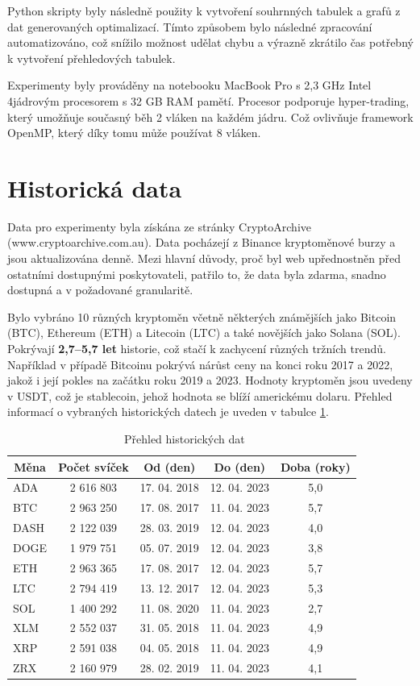 Python skripty byly následně použity k vytvoření souhrnných tabulek a grafů z dat generovaných optimalizací.
Tímto způsobem bylo následné zpracování automatizováno, což snížilo možnost udělat chybu a výrazně zkrátilo čas potřebný k vytvoření přehledových tabulek.

Experimenty byly prováděny na notebooku MacBook Pro s 2,3 GHz Intel 4jádrovým procesorem s 32 GB RAM pamětí.
Procesor podporuje hyper-trading, který umožňuje současný běh 2 vláken na každém jádru.
Což ovlivňuje framework OpenMP, který díky tomu může používat 8 vláken.

\section{Historická data}
Data pro experimenty byla získána ze stránky CryptoArchive (www.cryptoarchive.com.au).
Data pocházejí z Binance kryptoměnové burzy a jsou aktualizována denně.
Mezi hlavní důvody, proč byl web upřednostněn před ostatními dostupnými poskytovateli, patřilo to, že data byla zdarma, snadno dostupná a v požadované granularitě.

Bylo vybráno 10 různých kryptoměn včetně některých známějších jako Bitcoin (BTC), Ethereum (ETH) a Litecoin (LTC) a také novějších jako Solana (SOL).
Pokrývají \textbf{2,7--5,7 let} historie, což stačí k zachycení různých tržních trendů.
Například v případě Bitcoinu pokrývá nárůst ceny na konci roku 2017 a 2022, jakož i její pokles na začátku roku 2019 a 2023.
Hodnoty kryptoměn jsou uvedeny v USDT, což je stablecoin, jehož hodnota se blíží americkému dolaru.
Přehled informací o vybraných historických datech je uveden v tabulce \ref{tab:historical:market:data}.

\begin{table}[!htbp]
\centering
\centering
\caption[Přehled historických dat]{~Přehled historických dat}\label{tab:historical:market:data}
{%
\begin{tabular}{|l|c|c|c|c|}
\hline
\multicolumn{1}{|c|}{\textbf{Měna}} & \textbf{Počet svíček} & \textbf{Od (den)} & \textbf{Do (den)} & \textbf{Doba (roky)} \\ \hline
ADA  & 2 616 803 & 17. 04. 2018 & 12. 04. 2023 & 5,0 \\ \hline
BTC  & 2 963 250 & 17. 08. 2017 & 11. 04. 2023 & 5,7 \\ \hline
DASH & 2 122 039 & 28. 03. 2019 & 12. 04. 2023 & 4,0 \\ \hline
DOGE & 1 979 751 & 05. 07. 2019 & 12. 04. 2023 & 3,8 \\ \hline
ETH  & 2 963 365 & 17. 08. 2017 & 12. 04. 2023 & 5,7 \\ \hline
LTC  & 2 794 419 & 13. 12. 2017 & 12. 04. 2023 & 5,3 \\ \hline
SOL  & 1 400 292 & 11. 08. 2020 & 11. 04. 2023 & 2,7 \\ \hline
XLM  & 2 552 037 & 31. 05. 2018 & 11. 04. 2023 & 4,9 \\ \hline
XRP  & 2 591 038 & 04. 05. 2018 & 11. 04. 2023 & 4,9 \\ \hline
ZRX  & 2 160 979 & 28. 02. 2019 & 11. 04. 2023 & 4,1 \\ \hline
\end{tabular}%
}
\end{table}

